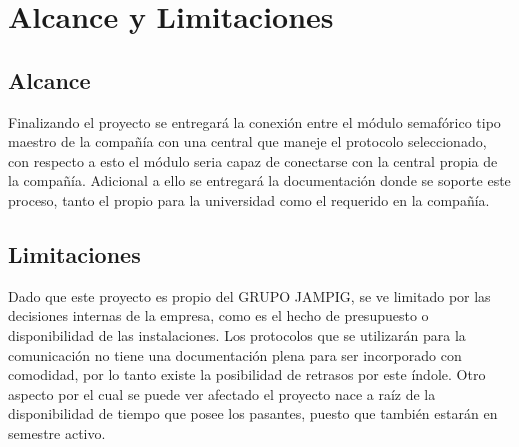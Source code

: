 \chapter{Alcance y Limitaciones}
\section{Alcance}
Finalizando el proyecto se entregará la conexión entre el módulo semafórico tipo maestro de la compañía con una central que maneje el protocolo seleccionado, con respecto a esto el módulo seria capaz de conectarse con la central propia de la compañía.
Adicional a ello se entregará la documentación  donde se soporte este proceso, tanto el propio para la universidad como el requerido en la compañía.


\section{Limitaciones} Dado que este proyecto es propio del GRUPO JAMPIG, se ve limitado por las decisiones internas de la empresa, como es el hecho de presupuesto o disponibilidad de las instalaciones.
Los protocolos que se utilizarán para la comunicación no tiene una documentación plena para ser incorporado con comodidad, por lo tanto existe la posibilidad de retrasos por este índole. Otro aspecto por el cual se puede ver afectado el proyecto nace a raíz de la disponibilidad  de tiempo que posee los pasantes, puesto que también estarán en semestre activo.